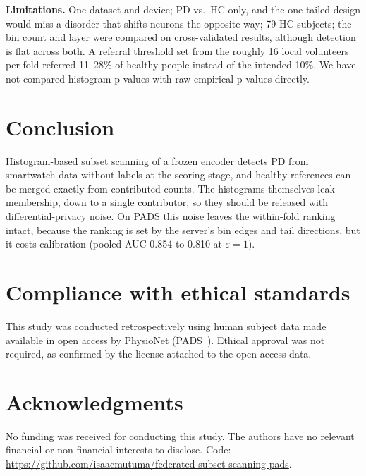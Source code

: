 \documentclass{article}
\begin{document}
\textbf{Limitations.} One dataset and device; PD vs.\ HC only, and the one-tailed design would miss a disorder that shifts neurons the opposite way; 79 HC subjects; the bin count and layer were compared on cross-validated results, although detection is flat across both. A referral threshold set from the roughly 16 local volunteers per fold referred 11--28\% of healthy people instead of the intended 10\%. We have not compared histogram p-values with raw empirical p-values directly.

\section{Conclusion}
\label{sec:conclusion}

Histogram-based subset scanning of a frozen encoder detects PD from smartwatch data without labels at the scoring stage, and healthy references can be merged exactly from contributed counts. The histograms themselves leak membership, down to a single contributor, so they should be released with differential-privacy noise. On PADS this noise leaves the within-fold ranking intact, because the ranking is set by the server's bin edges and tail directions, but it costs calibration (pooled AUC 0.854 to 0.810 at $\varepsilon{=}1$).

\section{Compliance with ethical standards}
\label{sec:ethics}

This study was conducted retrospectively using human subject data made available in open access by PhysioNet (PADS~\cite{varghese2024pads}). Ethical approval was not required, as confirmed by the license attached to the open-access data.

\section{Acknowledgments}
\label{sec:acknowledgments}

No funding was received for conducting this study. The authors have no relevant financial or non-financial interests to disclose. Code: \url{https://github.com/isaacmutuma/federated-subset-scanning-pads}.



\end{document}
